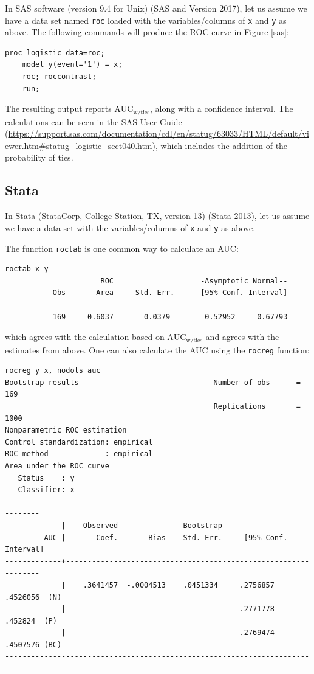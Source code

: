 \documentclass[smallextended]{svjour3}       %
\begin{document}
In SAS software (version 9.4 for Unix) (SAS and Version 2017), let us
assume we have a data set named \texttt{roc} loaded with the
variables/columns of \texttt{x} and \texttt{y} as above. The following
commands will produce the ROC curve in Figure \ref{sas}:

\begin{verbatim}
proc logistic data=roc;
    model y(event='1') = x;
    roc; roccontrast;
    run;      
\end{verbatim}

The resulting output reports \(\text{AUC}_{\text{w/ties}}\), along with
a confidence interval. The calculations can be seen in the SAS User
Guide
(\url{https://support.sas.com/documentation/cdl/en/statug/63033/HTML/default/viewer.htm\#statug_logistic_sect040.htm}),
which includes the addition of the probability of ties.

\hypertarget{stata}{%
\subsection{Stata}\label{stata}}

In Stata (StataCorp, College Station, TX, version 13) (Stata 2013), let
us assume we have a data set with the variables/columns of \texttt{x}
and \texttt{y} as above.

The function \texttt{roctab} is one common way to calculate an AUC:

\begin{verbatim}
roctab x y
                      ROC                    -Asymptotic Normal--
           Obs       Area     Std. Err.      [95% Conf. Interval]
         --------------------------------------------------------
           169     0.6037       0.0379        0.52952     0.67793
\end{verbatim}

which agrees with the calculation based on
\(\text{AUC}_{\text{w/ties}}\) and agrees with the estimates from above.
One can also calculate the AUC using the \texttt{rocreg} function:

\begin{verbatim}
rocreg y x, nodots auc
Bootstrap results                               Number of obs      =       169
                                                Replications       =      1000
Nonparametric ROC estimation
Control standardization: empirical
ROC method             : empirical
Area under the ROC curve
   Status    : y
   Classifier: x
------------------------------------------------------------------------------
             |    Observed               Bootstrap
         AUC |       Coef.       Bias    Std. Err.     [95% Conf. Interval]
-------------+----------------------------------------------------------------
             |    .3641457  -.0004513    .0451334     .2756857   .4526056  (N)
             |                                        .2771778    .452824  (P)
             |                                        .2769474   .4507576 (BC)
------------------------------------------------------------------------------
\end{verbatim}
\end{document}
